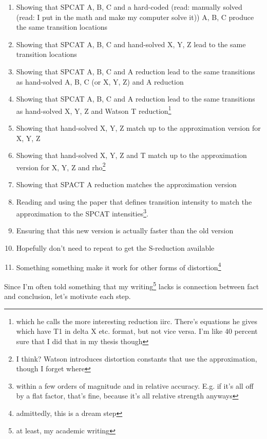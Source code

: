 \documentclass[12pt]{article}
\renewcommand{\,}{\textsuperscript{,}}
\begin{document}
\begin{enumerate}  
\item Showing that SPCAT A, B, C and a hard-coded (read: manually solved (read: I put in the math and make my computer solve it)) A, B, C produce the same transition locations  
\item Showing that SPCAT A, B, C and hand-solved X, Y, Z lead to the same transition locations  
\item Showing that SPCAT A, B, C and A reduction lead to the same transitions as hand-solved A, B, C (or X, Y, Z) and A reduction  
\item Showing that SPCAT A, B, C and A reduction lead to the same transitions as hand-solved X, Y, Z and Watson T reduction\footnote{which he calls the more interesting reduction iirc. There's equations he gives which have T1 in delta X etc. format, but not vice versa. I'm like 40 percent sure that I did that in my thesis though}  
\item Showing that hand-solved X, Y, Z match up to the approximation version for X, Y, Z  
\item Showing that hand-solved X, Y, Z and T match up to the approximation version for X, Y, Z and rho\footnote{I think? Watson introduces distortion constants that use the approximation, though I forget where}  
\item Showing that SPACT A reduction matches the approximation version  
\item Reading and using the paper that defines transition intensity to match the approximation to the SPCAT intensities\footnote{within a few orders of magnitude and in relative accuracy. E.g. if it's all off by a flat factor, that's fine, because it's all relative strength anyways}.  
\item Ensuring that this new version is actually faster than the old version  
\item Hopefully don't need to repeat to get the S-reduction available  
\item Something something make it work for other forms of distortion\footnote{admittedly, this is a dream step}  
\end{enumerate}

Since I'm often told something that my writing\footnote{at least, my academic writing} lacks is connection between fact and conclusion, let's motivate each step.
\end{document}
